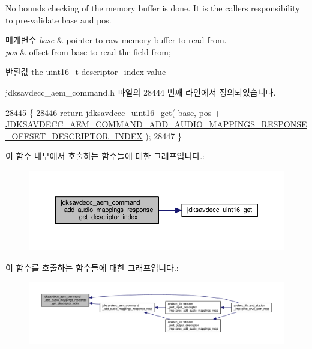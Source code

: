 No bounds checking of the memory buffer is done. It is the caller\textquotesingle{}s responsibility to pre-\/validate base and pos.


\begin{DoxyParams}{매개변수}
{\em base} & pointer to raw memory buffer to read from. \\
\hline
{\em pos} & offset from base to read the field from; \\
\hline
\end{DoxyParams}
\begin{DoxyReturn}{반환값}
the uint16\+\_\+t descriptor\+\_\+index value 
\end{DoxyReturn}


jdksavdecc\+\_\+aem\+\_\+command.\+h 파일의 28444 번째 라인에서 정의되었습니다.


\begin{DoxyCode}
28445 \{
28446     \textcolor{keywordflow}{return} \hyperlink{group__endian_ga3fbbbc20be954aa61e039872965b0dc9}{jdksavdecc\_uint16\_get}( base, pos + 
      \hyperlink{group__command__add__audio__mappings__response_ga0dde1646e180c9485735e2fb8be51d9a}{JDKSAVDECC\_AEM\_COMMAND\_ADD\_AUDIO\_MAPPINGS\_RESPONSE\_OFFSET\_DESCRIPTOR\_INDEX}
       );
28447 \}
\end{DoxyCode}


이 함수 내부에서 호출하는 함수들에 대한 그래프입니다.\+:
\nopagebreak
\begin{figure}[H]
\begin{center}
\leavevmode
\includegraphics[width=350pt]{group__command__add__audio__mappings__response_ga76045e388d5d0ff951b2a1e991196c01_cgraph}
\end{center}
\end{figure}




이 함수를 호출하는 함수들에 대한 그래프입니다.\+:
\nopagebreak
\begin{figure}[H]
\begin{center}
\leavevmode
\includegraphics[width=350pt]{group__command__add__audio__mappings__response_ga76045e388d5d0ff951b2a1e991196c01_icgraph}
\end{center}
\end{figure}


